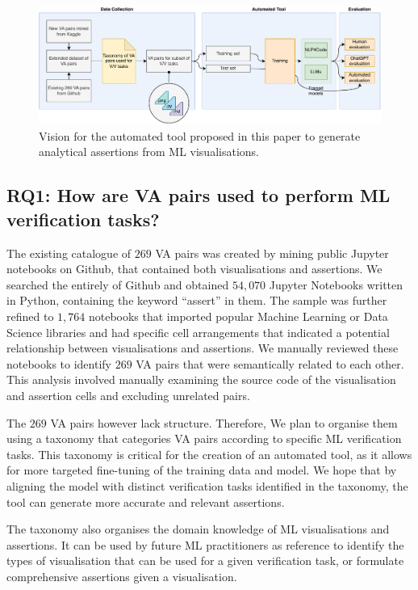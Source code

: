 \documentclass[sigconf]{acmart}
\begin{document}
\begin{figure} \includegraphics[width=\textwidth]{vision.pdf}
\caption{Vision for the automated tool proposed in this paper to
generate analytical assertions from ML visualisations.}
\label{fig:vision} \end{figure}

\subsection{RQ1: How are VA pairs used to perform ML verification tasks?}

The existing catalogue of $269$ VA pairs was created by mining public
Jupyter notebooks on Github, that contained both visualisations and
assertions. We searched the entirely of Github and obtained $54,070$
Jupyter Notebooks written in Python, containing the keyword ``assert''
in them. The sample was further refined to $1,764$ notebooks that
imported popular Machine Learning or Data Science libraries and had
specific cell arrangements that indicated a potential relationship
between visualisations and assertions. We manually reviewed these
notebooks to identify $269$ VA pairs that were semantically related to
each other. This analysis involved manually examining the source code
of the visualisation and assertion cells and excluding unrelated
pairs.

The $269$ VA pairs however lack structure. Therefore, We plan to
organise them using a taxonomy that categories VA pairs according to
specific ML verification tasks. This taxonomy is critical for the
creation of an automated tool, as it allows for more targeted
fine-tuning of the training data and model. We hope that by aligning
the model with distinct verification tasks identified in the taxonomy,
the tool can generate more accurate and relevant assertions.

The taxonomy also organises the domain knowledge of ML visualisations
and assertions. It can be used by future ML practitioners as reference
to identify the types of visualisation that can be used for a given
verification task, or formulate comprehensive assertions given a visualisation.
\end{document}
